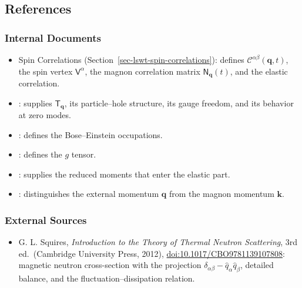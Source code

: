 \subsection{References}

\subsubsection{Internal Documents}

\begin{itemize}
\tightlist
\item
  Spin Correlations (Section~\ref{sec-lswt-spin-correlations}): defines \(\mathcal C^{\alpha\beta}(\mathbf q,t)\), the spin vertex \(\mathsf V^\alpha\), the magnon correlation matrix \(\mathsf N_{\mathbf q}(t)\), and the elastic correlation.
\item
  : supplies \(\mathsf T_{\mathbf q}\), its particle--hole structure, its gauge freedom, and its behavior at zero modes.
\item
  : defines the Bose--Einstein occupations.
\item
  : defines the \(g\) tensor.
\item
  : supplies the reduced moments that enter the elastic part.
\item
  : distinguishes the external momentum \(\mathbf q\) from the magnon momentum \(\mathbf k\).
\end{itemize}

\subsubsection{External Sources}

\begin{itemize}
\tightlist
\item
  G. L. Squires, \emph{Introduction to the Theory of Thermal Neutron Scattering}, 3rd ed.~(Cambridge University Press, 2012), \href{https://doi.org/10.1017/CBO9781139107808}{doi:10.1017/CBO9781139107808}: magnetic neutron cross-section with the projection \(\delta_{\alpha\beta}-\hat q_\alpha\hat q_\beta\), detailed balance, and the fluctuation--dissipation relation.
\end{itemize}
